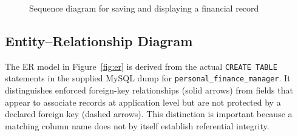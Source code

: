 \documentclass{tietreport}
\begin{document}
\begin{figure}[htbp]
\centering
\begin{center}
\end{center}
\caption{Sequence diagram for saving and displaying a financial record}
\label{fig:sequence}
\end{figure}

\subsection{Entity--Relationship Diagram}

The ER model in Figure~\ref{fig:er} is derived from the actual
\texttt{CREATE TABLE} statements in the supplied MySQL dump for
\texttt{personal\_finance\_manager}. It distinguishes enforced foreign-key
relationships (solid arrows) from fields that appear to associate records
at application level but are not protected by a declared foreign key
(dashed arrows). This distinction is important because a matching column
name does not by itself establish referential integrity.
\end{document}
